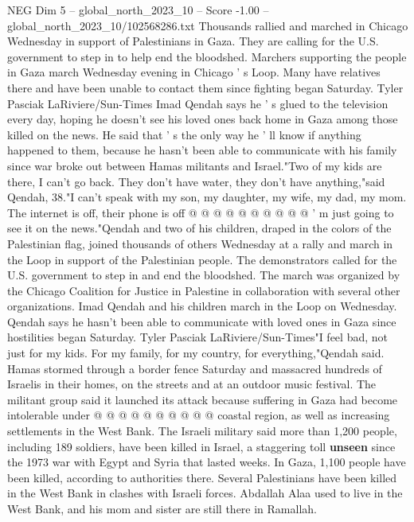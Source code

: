 \begin{textsample}{NEG Dim 5 – global\_north\_2023\_10 – Score -1.00 – global\_north\_2023\_10/102568286.txt}  \label{ex:f5_neg_028}
Thousands rallied and marched in Chicago Wednesday in support of Palestinians in Gaza.
They are calling for the U.S. government to step in to help end the bloodshed.
Marchers supporting the people in Gaza march Wednesday evening in Chicago ' s Loop.
Many have relatives there and have been unable to contact them since fighting began Saturday.
Tyler Pasciak LaRiviere/Sun-Times Imad Qendah says he ' s glued to the television every day, hoping he doesn't see his loved ones back home in Gaza among those killed on the news.
He said that ' s the only way he ' ll know if anything happened to them, because he hasn't been able to communicate with his family since war broke out between Hamas militants and Israel."Two of my kids are there, I can't go back.
They don't have water, they don't have anything,"said Qendah, 38."I can't speak with my son, my daughter, my wife, my dad, my mom.
The internet is off, their phone is off @ @ @ @ @ @ @ @ @ @ ' m just going to see it on the news."Qendah and two of his children, draped in the colors of the Palestinian flag, joined thousands of others Wednesday at a rally and march in the Loop in support of the Palestinian people.
The demonstrators called for the U.S. government to step in and end the bloodshed.
The march was organized by the Chicago Coalition for Justice in Palestine in collaboration with several other organizations.
Imad Qendah and his children march in the Loop on Wednesday.
Qendah says he hasn't been able to communicate with loved ones in Gaza since hostilities began Saturday.
Tyler Pasciak LaRiviere/Sun-Times"I feel bad, not just for my kids.
For my family, for my country, for everything,"Qendah said.
Hamas stormed through a border fence Saturday and massacred hundreds of Israelis in their homes, on the streets and at an outdoor music festival.
The militant group said it launched its attack because suffering in Gaza had become intolerable under @ @ @ @ @ @ @ @ @ @ coastal region, as well as increasing settlements in the West Bank.
The Israeli military said more than 1,200 people, including 189 soldiers, have been killed in Israel, a staggering toll \textbf{unseen} since the 1973 war with Egypt and Syria that lasted weeks.
In Gaza, 1,100 people have been killed, according to authorities there.
Several Palestinians have been killed in the West Bank in clashes with Israeli forces.
Abdallah Alaa used to live in the West Bank, and his mom and sister are still there in Ramallah.

\end{textsample}
